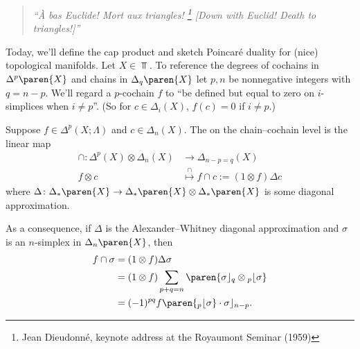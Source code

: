 \begin{quote}
    \textit{
    ``À bas Euclide! Mort aux triangles!%
    \footnote{%
        Jean Dieudonné, keynote address at the Royaumont Seminar (1959)
    } 
    [Down with Euclid! Death to triangles!]''
    }
\end{quote}

Today, we'll define the cap product and sketch Poincaré duality for (nice) topological manifolds. Let $X \in \Top$. To reference the degrees of cochains in ${\Delta}^{p}\paren{X}$ and chains in ${\Delta}_{q}\paren{X}$ let $p, n$ be nonnegative integers with $q = n-p$. We'll regard a $p$-cochain $f$ to ``be defined but equal to zero on $i$-simplices when $i \neq p$''. (So for $c \in \Delta_i(X)$, $f(c) = 0$ if $i \neq p$.) 

\begin{defn}
    Suppose $f \in \Delta^p(X; \Lambda)$ and $c \in \Delta_n(X)$. The  on the chain--cochain level is the linear map
        \begin{align*}
            \cap \colon \Delta^p(X) \otimes \Delta_n(X) &\to \Delta_{n-p = q}(X)\\
                f \otimes c &\overset{\cap}{\mapsto} f \cap c := (1 \otimes f) \Delta c
        \end{align*}
    where $\Delta \colon {\Delta}_{*}\paren{X} \to {\Delta}_{*}\paren{X} \otimes {\Delta}_{*}\paren{X}$ is some diagonal approximation.
\end{defn}

As a consequence, if $\Delta$ is the Alexander--Whitney diagonal approximation and $\sigma$ is an $n$-simplex in ${\Delta}_{n}\paren{X}$, then 
\begin{align*}
    f \cap \sigma 
        &= (1 \otimes f) \Delta \sigma \\
        &= (1 \otimes f) \sum\limits_{p+q = n}\paren{\front q \otimes \back p} \\
        &= (-1)^{pq} f\paren{\back{p}} \cdot \front{n-p}.
\end{align*}

